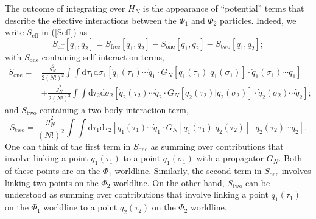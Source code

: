 The outcome of integrating over $H_{N}$ is the appearance of ``potential'' terms that describe the effective interactions between the $\Phi_{1}$ and $\Phi_{2}$ particles. Indeed, we write $S_{\text{eff}}$ in (\ref{Seff}) as
\begin{equation}
	S_{\text{eff}}[q_{1}, q_{2}] = S_{\text{free}}[q_{1}, q_{2}] - S_{\text{one}}[q_{1}, q_{2}] - S_{\text{two}}[q_{1}, q_{2}];
\end{equation}
with $S_{\text{one}}$ containing self-interaction terms,
\begin{equation}
\begin{split}
	S_{\text{one}} = {}& \frac{g_{N}^{2}}{2 (N!)^{2}} \int \int \mathrm{d}\tau_{1} \mathrm{d}\sigma_{1} \left[ \dot{q}_{1}(\tau_{1}) \cdots \dot{q}_{1} \cdot G_{N}[q_{1}(\tau_{1}) | q_{1}(\sigma_{1})] \cdot \dot{q}_{1}(\sigma_{1}) \cdots \dot{q}_{1} \right] \\
	&+ \frac{g_{N}^{2}}{2 (N!)^{2}} \int \int \mathrm{d}\tau_{2} \mathrm{d}\sigma_{2} \left[ \dot{q}_{2}(\tau_{2}) \cdots \dot{q}_{2} \cdot G_{N}[q_{2}(\tau_{2}) | q_{2}(\sigma_{2})] \cdot \dot{q}_{2}(\sigma_{2}) \cdots \dot{q}_{2} \right];
\end{split}
\label{S10}
\end{equation}
and $S_{\text{two}}$ containing a two-body interaction term,
\begin{equation}
	S_{\text{two}} = \frac{g_{N}^{2}}{(N!)^{2}} \int \int \mathrm{d}\tau_{1} \mathrm{d}\tau_{2} \left[ \dot{q}_{1}(\tau_{1}) \cdots \dot{q}_{1} \cdot G_{N}[q_{1}(\tau_{1}) | q_{2}(\tau_{2})] \cdot \dot{q}_{2}(\tau_{2}) \cdots \dot{q}_{2} \right].
	\label{S20}
\end{equation}
One can think of the first term in $S_{\text{one}}$ as summing over contributions that involve linking a point $q_{1}(\tau_{1})$ to a point $q_{1}(\sigma_{1})$ with a propagator $G_{N}$. Both of these points are on the $\Phi_{1}$ worldline. Similarly, the second term in $S_{\text{one}}$ involves linking two points on the $\Phi_{2}$ worldline. On the other hand, $S_{\text{two}}$ can be understood as summing over contributions that involve linking a point $q_{1}(\tau_{1})$ on the $\Phi_{1}$ worldline to a point $q_{2}(\tau_{2})$ on the $\Phi_{2}$ worldline.

